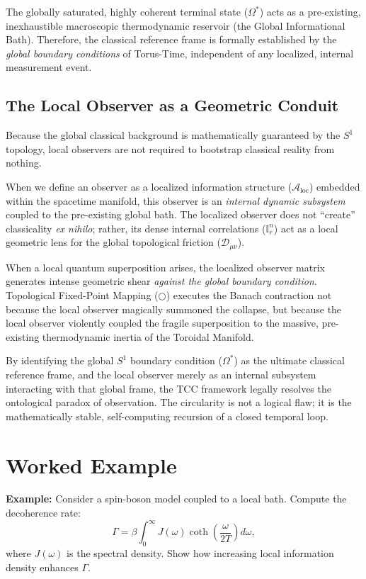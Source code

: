\documentclass[12pt,openany]{book}
\theoremstyle{plain}
\theoremstyle{definition}
\theoremstyle{remark}
\begin{document}
The globally saturated, highly coherent terminal state ($\Omega^*$) acts as a pre-existing, inexhaustible macroscopic thermodynamic reservoir (the Global Informational Bath). Therefore, the classical reference frame is formally established by the \emph{global boundary conditions} of Torus-Time, independent of any localized, internal measurement event.

\subsection{The Local Observer as a Geometric Conduit}

Because the global classical background is mathematically guaranteed by the $S^1$ topology, local observers are not required to bootstrap classical reality from nothing. 

When we define an observer as a localized information structure ($\mathcal{A}_{\mathrm{loc}}$) embedded within the spacetime manifold, this observer is an \emph{internal dynamic subsystem} coupled to the pre-existing global bath. The localized observer does not ``create'' classicality \textit{ex nihilo}; rather, its dense internal correlations ($\mathbb{I}_r^n$) act as a local geometric lens for the global topological friction ($\mathcal{D}_{\mu\nu}$). 

When a local quantum superposition arises, the localized observer matrix generates intense geometric shear \emph{against the global boundary condition}. Topological Fixed-Point Mapping ($\bigcirc$) executes the Banach contraction not because the local observer magically summoned the collapse, but because the local observer violently coupled the fragile superposition to the massive, pre-existing thermodynamic inertia of the Toroidal Manifold.

By identifying the global $S^1$ boundary condition ($\Omega^*$) as the ultimate classical reference frame, and the local observer merely as an internal subsystem interacting with that global frame, the TCC framework legally resolves the ontological paradox of observation. The circularity is not a logical flaw; it is the mathematically stable, self-computing recursion of a closed temporal loop.

\section{Worked Example}

\textbf{Example:} Consider a spin-boson model coupled to a local bath. 
Compute the decoherence rate:
\[
\Gamma = \beta \int_0^\infty J(\omega) \coth\left(\frac{\omega}{2T}\right) d\omega,
\]
where $J(\omega)$ is the spectral density. 
Show how increasing local information density enhances $\Gamma$.
\end{document}
